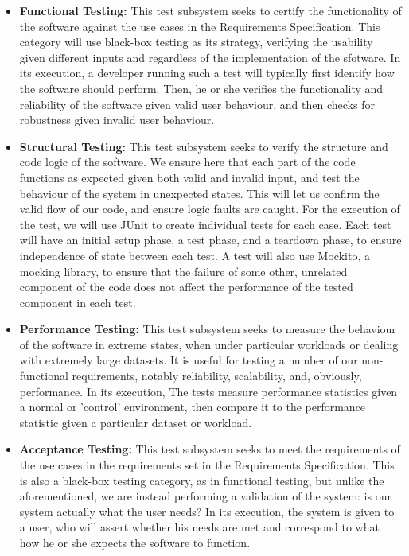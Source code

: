 \documentclass[12pt]{article}
\newcounter{req ID}
\begin{document}
\begin{itemize}
    \item \textbf{Functional Testing:} This test subsystem seeks to certify the functionality of the software against the use cases in the Requirements Specification. This category will use black-box testing as its strategy, verifying the usability given different inputs and regardless of the implementation of the sfotware. In its execution, a developer running such a test will typically first identify how the software should perform. Then, he or she verifies the functionality and reliability of the software given valid user behaviour, and then checks for robustness given invalid user behaviour.
    \item \textbf{Structural Testing:} This test subsystem seeks to verify the structure and code logic of the software. We ensure here that each part of the code functions as expected given both valid and invalid input, and test the behaviour of the system in unexpected states. This will let us confirm the valid flow of our code, and ensure logic faults are caught. For the execution of the test, we will use JUnit to create individual tests for each case. Each test will have an initial setup phase, a test phase, and a teardown phase, to ensure independence of state between each test. A test will also use Mockito, a mocking library, to ensure that the failure of some other, unrelated component of the code does not affect the performance of the tested component in each test.
    \item \textbf{Performance Testing:} This test subsystem seeks to measure the behaviour of the software in extreme states, when under particular workloads or dealing with extremely large datasets. It is useful for testing a number of our non-functional requirements, notably reliability, scalability, and, obviously, performance. In its execution, The tests measure performance statistics given a normal or 'control' environment, then compare it to the performance statistic given a particular dataset or workload.
    \item \textbf{Acceptance Testing:} This test subsystem seeks to meet the requirements of the use cases in the requirements set in the Requirements Specification. This is also a black-box testing category, as in functional testing, but unlike the aforementioned, we are instead performing a validation of the system: is our system actually what the user needs? In its execution, the system is given to a user, who will assert whether his needs are met and correspond to what how he or she expects the software to function.

\end{itemize}
\end{document}
